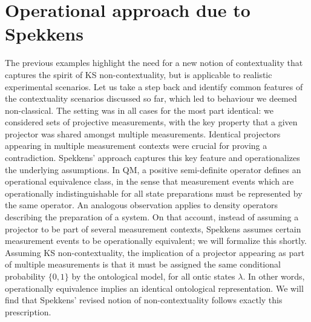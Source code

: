 \section{Operational approach due to Spekkens}
\label{sec:spekkensopappr}
The previous examples highlight the need for a new notion of contextuality that captures the spirit of KS non-contextuality, but is applicable to realistic experimental scenarios. Let us take a step back and identify common features of the contextuality scenarios discussed so far, which led to behaviour we deemed non-classical. The setting was in all cases for the most part identical: we considered sets of projective measurements, with the key property that a given projector was shared amongst multiple measurements. Identical projectors appearing in multiple measurement contexts were crucial for proving a contradiction. Spekkens' approach captures this key feature and operationalizes the underlying assumptions. In QM, a positive semi-definite operator defines an operational equivalence class, in the sense that measurement events which are operationally indistinguishable for all state preparations must be represented by the same operator. An analogous observation applies to density operators describing the preparation of a system.
On that account, instead of assuming a projector to be part of several measurement contexts, Spekkens assumes certain measurement events to be operationally equivalent; we will formalize this shortly. Assuming KS non-contextuality, the implication of a projector appearing as part of multiple measurements is that it must be assigned the same conditional probability $\{0,1\}$ by the ontological model, for all ontic states $\lambda$. In other words, operationally equivalence implies an identical ontological representation. We will find that Spekkens' revised notion of non-contextuality follows exactly this prescription.  

